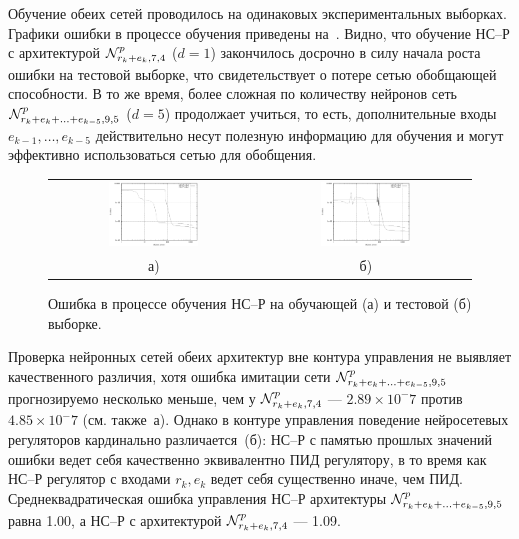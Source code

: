 Обучение обеих сетей проводилось на одинаковых экспериментальных
выборках.  Графики ошибки в процессе обучения приведены
на~.  Видно, что обучение НС--Р
с архитектурой $\mathcal{N}^p_{r_k+e_k,7,4}$ ($d=1$) закончилось досрочно в
силу начала роста ошибки на тестовой выборке, что свидетельствует о
потере сетью обобщающей способности.  В то же время, более сложная по
количеству нейронов сеть $\mathcal{N}^p_{r_k+e_k+\ldots+e_{k-5},9,5}$ ($d=5$)
продолжает учиться, то есть, дополнительные входы
$e_{k-1},\ldots,e_{k-5}$ действительно несут полезную информацию для
обучения и могут эффективно использоваться сетью для обобщения.

\begin{figure}
  \centering
  \begin{tabular}{cc}
    \includegraphics[width=0.45\textwidth,%
      totalheight=0.25\textheight]{cstr_e5r1_vs_e1r1_training_learn_rus}
    &
    \includegraphics[width=0.45\textwidth,%
      totalheight=0.25\textheight]{cstr_e5r1_vs_e1r1_training_test_rus} \\
    а) & б)
  \end{tabular}
  \caption{Ошибка в процессе обучения НС--Р на обучающей (а) и тестовой (б) выборке.}%
  \label{fig:cstr_e5r1_vs_e1r1_training}
\end{figure}

Проверка нейронных сетей обеих архитектур вне контура управления не
выявляет качественного различия, хотя ошибка имитации сети
$\mathcal{N}^p_{r_k+e_k+\ldots+e_{k-5},9,5}$ прогнозируемо несколько меньше,
чем у $\mathcal{N}^p_{r_k+e_k,7,4}$ --- $2.89\times 10^-7$ против $4.85\times
10^-7$ (см. также~а).  Однако в
контуре управления поведение нейросетевых регуляторов кардинально
различается~(б): НС--Р с памятью
прошлых значений ошибки ведет себя качественно эквивалентно ПИД
регулятору, в то время как НС--Р регулятор с входами $r_k,e_k$ ведет
себя существенно иначе, чем ПИД.  Среднеквадратическая ошибка
управления НС--Р архитектуры $\mathcal{N}^p_{r_k+e_k+\ldots+e_{k-5},9,5}$
равна 1.00, а НС--Р с архитектурой $\mathcal{N}^p_{r_k+e_k,7,4}$ --- 1.09.

